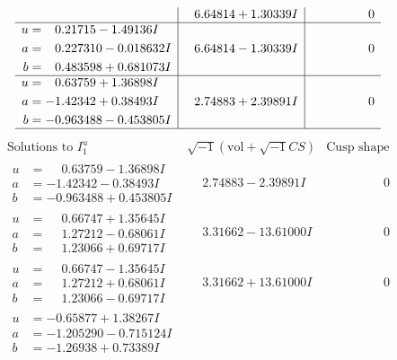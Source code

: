 \documentclass[1p]{elsarticle_modified}
\theoremstyle{definition}
\newcommand{\I}{\sqrt{-1}}
\begin{document}
$$\begin{array}{c|c|c}
 & \phantom{-}6.64814 + 1.30339 I & \phantom{-0.000000 } 0 \\ \hline\begin{aligned}
u &= \phantom{-}0.21715 - 1.49136 I \\
a &= \phantom{-}0.227310 - 0.018632 I \\
b &= \phantom{-}0.483598 + 0.681073 I\end{aligned}
 & \phantom{-}6.64814 - 1.30339 I & \phantom{-0.000000 } 0 \\ \hline\begin{aligned}
u &= \phantom{-}0.63759 + 1.36898 I \\
a &= -1.42342 + 0.38493 I \\
b &= -0.963488 - 0.453805 I\end{aligned}
 & \phantom{-}2.74883 + 2.39891 I & \phantom{-0.000000 } 0\\
 \hline 
 \end{array}$$\newpage$$\begin{array}{c|c|c}  
\text{Solutions to }I^u_{1}& \I (\text{vol} + \sqrt{-1}CS) & \text{Cusp shape}\\
 \hline 
\begin{aligned}
u &= \phantom{-}0.63759 - 1.36898 I \\
a &= -1.42342 - 0.38493 I \\
b &= -0.963488 + 0.453805 I\end{aligned}
 & \phantom{-}2.74883 - 2.39891 I & \phantom{-0.000000 } 0 \\ \hline\begin{aligned}
u &= \phantom{-}0.66747 + 1.35645 I \\
a &= \phantom{-}1.27212 - 0.68061 I \\
b &= \phantom{-}1.23066 + 0.69717 I\end{aligned}
 & \phantom{-}3.31662 - 13.61000 I & \phantom{-0.000000 } 0 \\ \hline\begin{aligned}
u &= \phantom{-}0.66747 - 1.35645 I \\
a &= \phantom{-}1.27212 + 0.68061 I \\
b &= \phantom{-}1.23066 - 0.69717 I\end{aligned}
 & \phantom{-}3.31662 + 13.61000 I & \phantom{-0.000000 } 0 \\ \hline\begin{aligned}
u &= -0.65877 + 1.38267 I \\
a &= -1.205290 - 0.715124 I \\
b &= -1.26938 + 0.73389 I\end{aligned}

\end{array}$$
\end{document}
